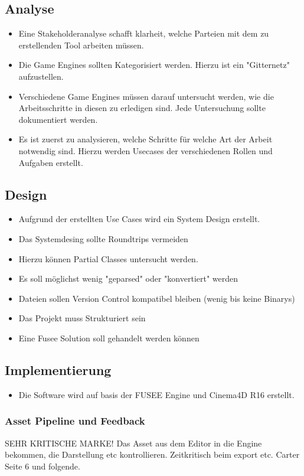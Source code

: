 \documentclass[pagesize, paper=a4, fontsize=12pt,titlepage=true, headings=small, headnosepline, abstractoff, liststotoc, nochapterprefix, plainheadsepline, twoside]{scrreprt}
\begin{document}
\subsection{Analyse}
\begin{itemize}
\item Eine Stakeholderanalyse schafft klarheit, welche Parteien mit dem zu erstellenden Tool arbeiten müssen.
\item Die Game Engines sollten Kategorisiert werden. Hierzu ist ein "Gitternetz" aufzustellen.
\item Verschiedene Game Engines müssen darauf untersucht werden, wie die Arbeitsschritte in diesen zu erledigen sind. Jede Untersuchung sollte dokumentiert werden.
\item Es ist zuerst zu analysieren, welche Schritte für welche Art der Arbeit notwendig sind. Hierzu werden Usecases der verschiedenen Rollen und Aufgaben erstellt.
\end{itemize}

\subsection{Design}
\begin{itemize}
\item Aufgrund der erstellten Use Cases wird ein System Design erstellt.
\item Das Systemdesing sollte Roundtrips vermeiden
\item Hierzu können Partial Classes untersucht werden.
\item Es soll möglichst wenig "geparsed" oder "konvertiert" werden
\item Dateien sollen Version Control kompatibel bleiben (wenig bis keine Binarys)
\item Das Projekt muss Strukturiert sein
\item Eine Fusee Solution soll gehandelt werden können
\end{itemize}

\subsection{Implementierung}
\begin{itemize}
\item Die Software wird auf basis der FUSEE Engine und Cinema4D R16 erstellt.
\end{itemize}

\subsubsection{Asset Pipeline und Feedback}
SEHR KRITISCHE MARKE! Das Asset aus dem Editor in die Engine bekommen, die Darstellung etc kontrollieren.
Zeitkritisch beim export etc.
Carter Seite 6 und folgende.
\end{document}
